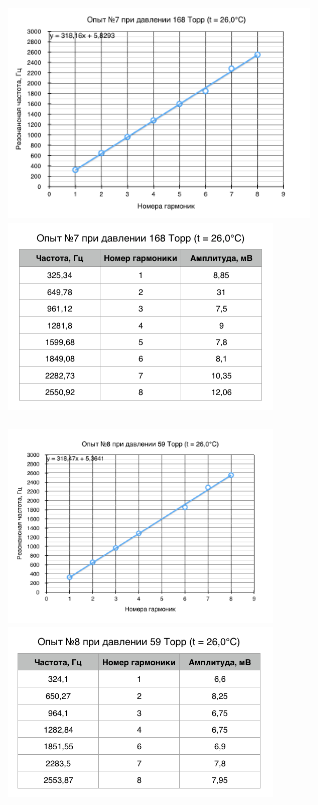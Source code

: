 \documentclass[a4paper,12pt]{article}
\begin{document}
\begin{figure}[h]
	\begin{multicols}{2}
		\hfill
		\includegraphics[width=80mm]{gr7.png}
		\hfill
		\label{gr7}
		\hfill
		\includegraphics[width=70mm]{t7.png}
		\hfill
		\label{t7}
	\end{multicols}
\end{figure}
\begin{figure}[h]
	\begin{multicols}{2}
		\hfill
		\includegraphics[width=70mm]{gr8.png}
		\hfill
		\label{gr8}
		\hfill
		\includegraphics[width=70mm]{t8.png}
		\hfill
		\label{t8}
	\end{multicols}
\end{figure}
\clearpage
\setcounter{equation}{0}
\end{document}
